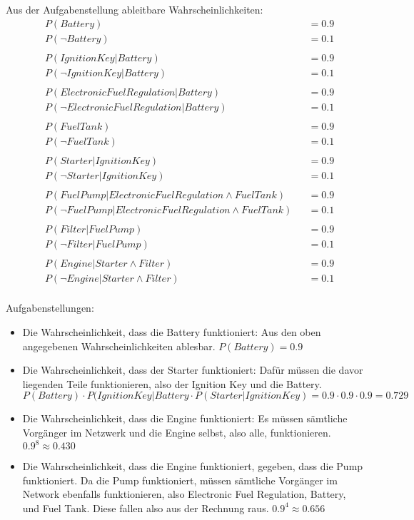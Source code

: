 \documentclass[ngerman]{fbi-aufgabenblatt}
\begin{document}
Aus der Aufgabenstellung ableitbare Wahrscheinlichkeiten:
\begin{align*}
&P(Battery) &&= 0.9\\
&P(\neg Battery) &&= 0.1\\
&\\
&P(Ignition Key|Battery) &&= 0.9\\
&P(\neg Ignition Key| Battery) &&= 0.1\\
&\\
&P(Electronic Fuel Regulation|Battery) &&= 0.9\\
&P(\neg Electronic Fuel Regulation| Battery) &&= 0.1\\
&\\
&P(Fuel Tank) &&= 0.9\\
&P(\neg Fuel Tank) &&= 0.1\\
&\\
&P(Starter| Ignition Key) &&= 0.9\\
&P(\neg Starter | Ignition Key) &&= 0.1\\
&\\
&P(Fuel Pump | Electronic Fuel Regulation \land Fuel Tank) &&= 0.9\\
&P(\neg Fuel Pump | Electronic Fuel Regulation \land Fuel Tank) &&= 0.1\\
&\\
&P(Filter | Fuel Pump) &&= 0.9\\
&P(\neg Filter | Fuel Pump) &&= 0.1\\
&\\
&P(Engine | Starter \land Filter) &&= 0.9\\
&P(\neg Engine | Starter \land Filter) &&= 0.1\\
\end{align*}

Aufgabenstellungen:

\begin{itemize}
\item Die Wahrscheinlichkeit, dass die Battery funktioniert: Aus den oben angegebenen Wahrscheinlichkeiten ablesbar. \(P(Battery) = 0.9\)
\item Die Wahrscheinlichkeit, dass der Starter funktioniert: Dafür müssen die davor liegenden Teile funktionieren, also der Ignition Key und die Battery. \(P(Battery) \cdot P(IgnitionKey|Battery \cdot P(Starter|IgnitionKey) = 0.9 \cdot 0.9 \cdot 0.9 = 0.729\)
\item Die Wahrscheinlichkeit, dass die Engine funktioniert: Es müssen sämtliche Vorgänger im Netzwerk und die Engine selbst, also alle, funktionieren. \(0.9^{8} \approx 0.430\)
\item Die Wahrscheinlichkeit, dass die Engine funktioniert, gegeben, dass die Pump funktioniert. Da die Pump funktioniert, müssen sämtliche Vorgänger im Network ebenfalls funktionieren, also Electronic Fuel Regulation, Battery, und Fuel Tank. Diese fallen also aus der Rechnung raus. \(0.9^{4} \approx 0.656\)
\end{itemize}
\end{document}
